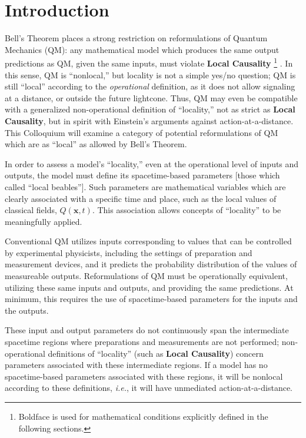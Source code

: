 \documentclass[onecolumn, nofootinbib, 12pt]{revtex4-1}
\begin{document}
\tableofcontents

\newpage
{}

\section{Introduction}

Bell's Theorem places a strong restriction on reformulations of Quantum Mechanics (QM): any mathematical model which produces the same output predictions as QM, given the same inputs, must violate {\bf Local Causality}%
\footnote{Boldface is used for mathematical conditions explicitly defined in the following sections.} \cite{bell1964}.
In this sense, QM is ``nonlocal,'' but locality is not a simple yes/no question; QM is still ``local'' according to the \emph{operational} definition, as it does not allow signaling at a distance, or outside the future lightcone.  Thus, QM may even be compatible with a generalized non-operational definition of ``locality,'' not as strict as {\bf Local Causality}, but in spirit with Einstein's arguments against action-at-a-distance.  This Colloquium will examine a category of potential reformulations of QM which are as ``local'' as allowed by Bell's Theorem.

In order to assess a model's ``locality,'' even at the operational level of inputs and outputs, the model must define its spacetime-based parameters [those which \textcite{bell1976b} called ``local beables''].  Such parameters are mathematical variables which are clearly associated with a specific time and place, such as the local values of classical fields, $Q(\bm{x},t)$.  This association allows concepts of ``locality'' to be meaningfully applied.  

Conventional QM utilizes inputs corresponding to values that can be controlled by experimental physicists, including the settings of preparation and measurement devices, and it predicts the probability distribution of the values of measureable outputs.  Reformulations of QM must be operationally equivalent, utilizing these same inputs and outputs, and providing the same predictions.  At minimum, this requires the use of spacetime-based parameters for the inputs and the outputs.

These input and output parameters do not continuously span the intermediate spacetime regions where preparations and measurements are not performed; non-operational definitions of ``locality'' (such as {\bf Local Causality}) concern parameters associated with these intermediate regions.  If a model has no spacetime-based parameters associated with these regions, it will be nonlocal according to these definitions, \emph{i.e.}, it will have unmediated action-at-a-distance.
\end{document}
